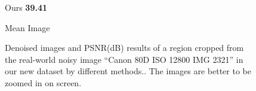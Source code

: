 \begin{figure}[t!]
{\begin{minipage}[t]{0.19\textwidth}
{\footnotesize Ours \textbf{39.41}}
\end{minipage}
\begin{minipage}[t]{0.19\textwidth}
\centering
{}
{\footnotesize Mean Image}
\end{minipage}
} \vspace{-3mm}
    \caption{Denoised images and PSNR(dB) results of a region cropped from the real-world noisy image ``Canon 80D ISO 12800 IMG 2321'' in our new dataset by different methods.. The images are better to be zoomed in on screen.}
    \label{fig3-18}
\end{figure}

